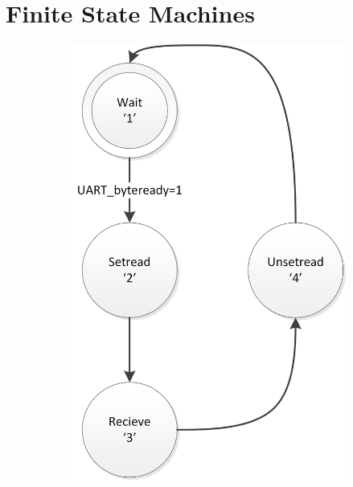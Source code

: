 \documentclass{report}
\begin{document}
\section{Finite State Machines}
\label{sec:statemachines}
\begin{figure}[H]
\centering
\caption{De FSM's op de FPGA}
\begin{subfigure}{0.40\linewidth}
\label{fig:fsmReceiver}
\includegraphics[width=\linewidth]{FSMReceiver}
\end{subfigure}
\quad
\begin{subfigure}{0.40\linewidth}
\label{fig:fsmSender}

\end{subfigure}
\end{figure}
\end{document}
